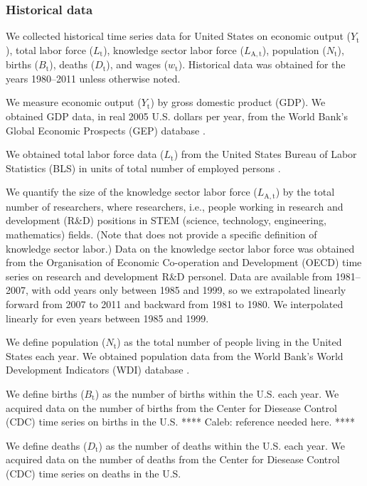 \documentclass[letterpaper,12pt]{article}
\begin{document}
\subsubsection{Historical data}
\label{sec:basic_model_historical_data}

We collected historical time series data for United States on economic output ($Y_\mathrm{t}$), total labor force ($L_\mathrm{t}$), knowledge sector labor force ($L_\mathrm{A,t}$), population ($N_\mathrm{t}$), births ($B_\mathrm{t}$), deaths ($D_\mathrm{t}$), and wages ($w_\mathrm{t}$). Historical data was obtained for the years 1980--2011 unless otherwise noted. 

We measure economic output ($Y_\mathrm{t}$) by gross domestic product (GDP). We obtained GDP data, in real 2005 U.S. dollars per year, from the World Bank's Global Economic Prospects (GEP) database \citep{WorldBankGEP:2013a}.

We obtained total labor force data ($L_\mathrm{t}$) from the United States Bureau of Labor Statistics (BLS) in units of total number of employed persons \citep{BLS:2013a}. 

We quantify the size of the knowledge sector labor force ($L_\mathrm{A,t}$) by the total number of researchers, where researchers, i.e., people working in research and development (R\&D) positions in STEM (science, technology, engineering, mathematics) fields. (Note that \citet{Jones:2001wn} does not provide a specific definition of knowledge sector labor.) Data on the knowledge sector labor force was obtained from the Organisation of Economic Co-operation and Development (OECD) time series on research and development R\&D personel. Data are available from 1981--2007, with odd years only between 1985 and 1999, so we extrapolated linearly forward from 2007 to 2011 and backward from 1981 to 1980. We interpolated linearly for even years between 1985 and 1999.

We define population ($N_\mathrm{t}$) as the total number of people living in the United States each year. We obtained population data from the World Bank's World Development Indicators (WDI) database \citep{WorldBankWDI:2013a}.

We define births ($B_\mathrm{t}$) as the number of births within the U.S. each year. We acquired data on the number of births from the Center for Diesease Control (CDC) time series on births in the U.S. **** Caleb: reference needed here. **** 

We define deaths ($D_\mathrm{t}$) as the number of deaths within the U.S. each year. We acquired data on the number of deaths from the Center for Diesease Control (CDC) time series on deaths in the U.S.
\end{document}
